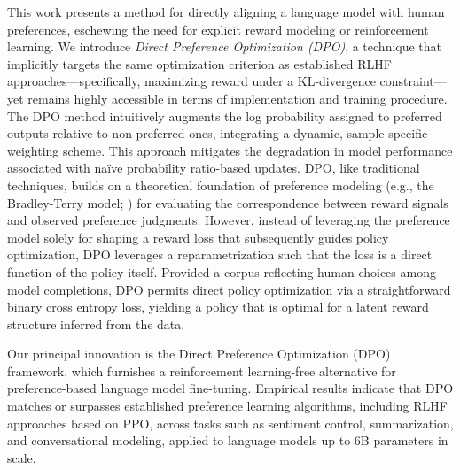 This work presents a method for directly aligning a language model with human preferences, eschewing the need for explicit reward modeling or reinforcement learning. We introduce \textit{{Direct Preference Optimization} (DPO)}, a technique that implicitly targets the same optimization criterion as established RLHF approaches—specifically, maximizing reward under a KL-divergence constraint—yet remains highly accessible in terms of implementation and training procedure. The DPO method intuitively augments the log probability assigned to preferred outputs relative to non-preferred ones, integrating a dynamic, sample-specific weighting scheme. This approach mitigates the degradation in model performance associated with naïve probability ratio-based updates. DPO, like traditional techniques, builds on a theoretical foundation of preference modeling (e.g., the Bradley-Terry model; \cite{bradley1952rankanalysis}) for evaluating the correspondence between reward signals and observed preference judgments. However, instead of leveraging the preference model solely for shaping a reward loss that subsequently guides policy optimization, DPO leverages a reparametrization such that the loss is a direct function of the policy itself. Provided a corpus reflecting human choices among model completions, DPO permits direct policy optimization via a straightforward binary cross entropy loss, yielding a policy that is optimal for a latent reward structure inferred from the data.

Our principal innovation is the Direct Preference Optimization (DPO) framework, which furnishes a reinforcement learning-free alternative for preference-based language model fine-tuning. Empirical results indicate that DPO matches or surpasses established preference learning algorithms, including RLHF approaches based on PPO, across tasks such as sentiment control, summarization, and conversational modeling, applied to language models up to 6B parameters in scale.

